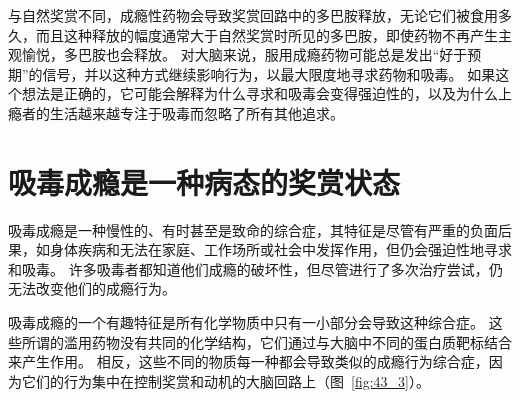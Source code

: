 与自然奖赏不同，成瘾性药物会导致奖赏回路中的多巴胺释放，无论它们被食用多久，而且这种释放的幅度通常大于自然奖赏时所见的多巴胺，即使药物不再产生主观愉悦，多巴胺也会释放。
对大脑来说，服用成瘾药物可能总是发出“好于预期”的信号，并以这种方式继续影响行为，以最大限度地寻求药物和吸毒。
如果这个想法是正确的，它可能会解释为什么寻求和吸毒会变得强迫性的，以及为什么上瘾者的生活越来越专注于吸毒而忽略了所有其他追求。



\section{吸毒成瘾是一种病态的奖赏状态}

吸毒成瘾是一种慢性的、有时甚至是致命的综合症，其特征是尽管有严重的负面后果，如身体疾病和无法在家庭、工作场所或社会中发挥作用，但仍会强迫性地寻求和吸毒。
许多吸毒者都知道他们成瘾的破坏性，但尽管进行了多次治疗尝试，仍无法改变他们的成瘾行为。


吸毒成瘾的一个有趣特征是所有化学物质中只有一小部分会导致这种综合症。
这些所谓的滥用药物没有共同的化学结构，它们通过与大脑中不同的蛋白质靶标结合来产生作用。
相反，这些不同的物质每一种都会导致类似的成瘾行为综合症，因为它们的行为集中在控制奖赏和动机的大脑回路上（图~\ref{fig:43_3}）。


